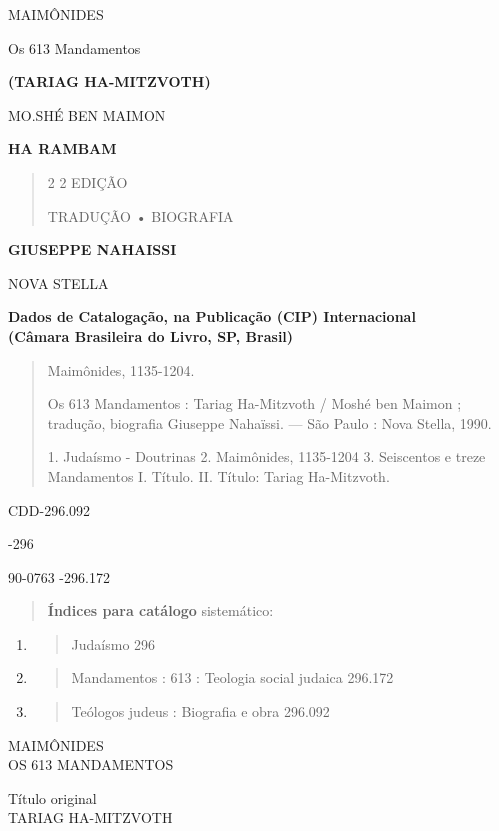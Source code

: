 MAIMÔNIDES

Os 613 Mandamentos


\textbf{(TARIAG HA-MITZVOTH)}

MO.SHÉ BEN MAIMON

\textbf{HA RAMBAM}

\begin{quote}
2 2 EDIÇÃO

TRADUÇÃO • BIOGRAFIA
\end{quote}

\textbf{GIUSEPPE NAHAISSI}

NOVA STELLA

\textbf{Dados de Catalogação, na Publicação (CIP) Internacional\\
(Câmara Brasileira do Livro, SP, Brasil)}

\begin{quote}
Maimônides, 1135-1204.

Os 613 Mandamentos : Tariag Ha-Mitzvoth / Moshé ben Maimon ; tradução,
biografia Giuseppe Nahaïssi. --- São Paulo : Nova Stella, 1990.

1. Judaísmo - Doutrinas 2. Maimônides, 1135-1204 3. Seiscentos e treze
Mandamentos I. Título. II. Título: Tariag Ha-Mitzvoth.
\end{quote}

CDD-296.092

-296

90-0763 -296.172

\begin{quote}
\textbf{Índices para catálogo} sistemático:
\end{quote}

\begin{enumerate}
\def\labelenumi{\arabic{enumi}.}
\item
  \begin{quote}
  Judaísmo 296
  \end{quote}
\item
  \begin{quote}
  Mandamentos : 613 : Teologia social judaica 296.172
  \end{quote}
\item
  \begin{quote}
  Teólogos judeus : Biografia e obra 296.092
  \end{quote}
\end{enumerate}

MAIMÔNIDES\\
OS 613 MANDAMENTOS

Título original\\
TARIAG HA-MITZVOTH

